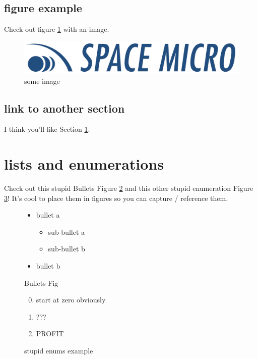 \documentclass[oneside,english,chapters]{smireport}
\begin{document}
\subsection{figure example}
Check out figure \ref{fig:image} with an image.

\begin{figure}
  \begin{center}\includegraphics[width=0.25\columnwidth,height=0.25\textheight,keepaspectratio]{./images/smi-logo.png}\end{center}
\caption{some image}\label{fig:image}
\end{figure}

\subsection{link to another section}
I think you'll like Section \ref{sec:landn}.

\section{lists and enumerations}
\label{sec:landn}

Check out this stupid Bullets Figure \ref{fig:bullets} and this other stupid enumeration Figure \ref{fig:enum}!
It's cool to place them in figures so you can capture / reference them.

\begin{figure}[H] %
\begin{itemize}
  \item bullet a
  \begin{itemize}
    \item sub-bullet a
    \item sub-bullet b
  \end{itemize}
  \item bullet b
\end{itemize}
\caption{Bullets Fig}\label{fig:bullets}
\end{figure}

\begin{figure}
\begin{enumerate}
  \setcounter{enumi}{-1} %
  \item start at zero obviously
  \item ???
  \item PROFIT
\end{enumerate}
\caption{stupid enums example}\label{fig:enum}
\end{figure}


\end{document}
